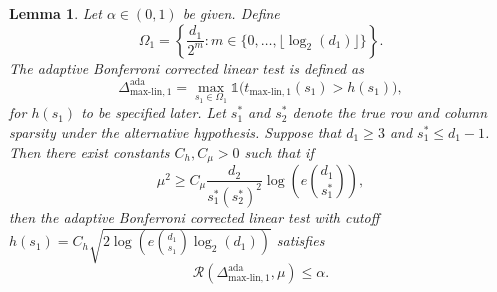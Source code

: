 \documentclass{article}
\newcommand{\cR}{\mathcal{R}}
\newcommand{\one}{\mathds{1}}
\newcommand{\linmax}{\text{max-lin}}
\newtheorem{lemma}{Lemma}
\theoremstyle{remark}
\begin{document}
\begin{lemma}\label{lem_ub_ada_maxlinear}
    Let $\alpha \in (0,1)$ be given. Define
    \[\Omega_1 = \left\{\frac{d_1}{2^m}: m \in \{0, \ldots, \lfloor \log_2(d_1) \rfloor\}\right\}.\]
    The adaptive Bonferroni corrected linear test is defined as
    \[\Delta^{\text{ada}}_{\linmax, 1} = \max_{s_1 \in \Omega_1}\one\big(t_{\linmax, 1}(s_1) > h(s_1)\big),\]
    for $h(s_1)$ to be specified later. Let $s_1^*$ and $s_2^*$ denote the true row and column sparsity under the alternative hypothesis. Suppose that $d_1 \geq 3$ and $s_1^* \leq d_1 - 1$. Then there exist constants $C_h, C_{\mu} > 0$ such that if
    \[\mu^2 \geq C_\mu \frac{d_2}{s^*_1(s^*_2)^2}\log\left(e {d_1 \choose s^*_1}\right),\]
    then the adaptive Bonferroni corrected linear test with cutoff $h(s_1) = C_h\sqrt{2\log\left(e {d_1 \choose s_1}\log_2(d_1)\right)}$ satisfies
    \[\cR(\Delta^{\text{ada}}_{\linmax, 1}, \mu) \leq \alpha.\]
\end{lemma}
\end{document}
